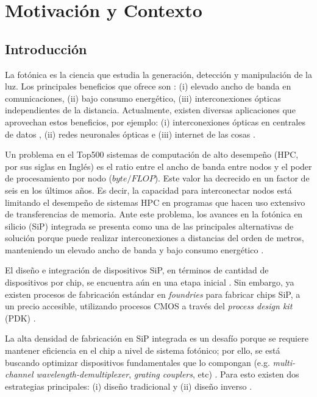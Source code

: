 \chapter{Motivación y Contexto}\label{chapter:introduction}

\section{Introducción}

La fotónica es la ciencia que estudia la generación, detección y manipulación de la luz. 
Los principales beneficios que ofrece son \citep{Shen2019}:
(i) elevado ancho de banda en comunicaciones, 
(ii) bajo consumo energético,
(iii) interconexiones ópticas independientes de la distancia.
Actualmente, existen diversas aplicaciones que aprovechan estos beneficios, por ejemplo:
(i) interconexiones ópticas en centrales de datos \citep{Shen2019},
(ii) redes neuronales ópticas \citep{Shen2017} e
(iii) internet de las cosas \citep{Li2021}.


Un problema en el Top500 sistemas de computación de alto desempeño (HPC, por sus siglas en Inglés) 
es el ratio entre el ancho de banda entre nodos y el poder de procesamiento por nodo ($byte / FLOP$).
Este valor ha decrecido en un factor de seis en los últimos años.
Es decir, la capacidad para interconectar nodos está
limitando el desempeño de sistemas HPC en programas que hacen uso extensivo de transferencias de memoria.
Ante este problema, los avances en la fotónica en silicio (SiP) integrada se presenta como una de las
principales alternativas de solución porque puede realizar interconexiones a distancias del orden de metros,
manteniendo un elevado ancho de banda y bajo consumo energético \citep{Shen2019, Anderson2018}.

El diseño e integración de dispositivos SiP, en términos
de cantidad de dispositivos por chip, se encuentra aún en una etapa inicial
\citep{LukasChrostowski2010, Glick2018}.
Sin embargo, ya existen procesos de fabricación estándar en \emph{foundries}
para fabricar chips SiP, a un precio accesible, utilizando procesos CMOS
a través del \emph{process design kit} (PDK) \citep{Bogaerts2018}.

La alta densidad de fabricación en SiP integrada es un desafío
porque se requiere mantener eficiencia en el chip a nivel de sistema fotónico;
por ello, se está buscando optimizar dispositivos fundamentales que lo compongan 
(e.g. \emph{multi-channel wavelength-demultiplexer}, \emph{grating couplers}, etc) \citep{Vuckovic2019}.
Para esto existen dos estrategias principales: (i) diseño tradicional
\citep{Hughes2016, Song2008, Huang2018} y (ii) diseño inverso \citep{Malheiros-Silveira2020, Gregory2015, Su2020}.


